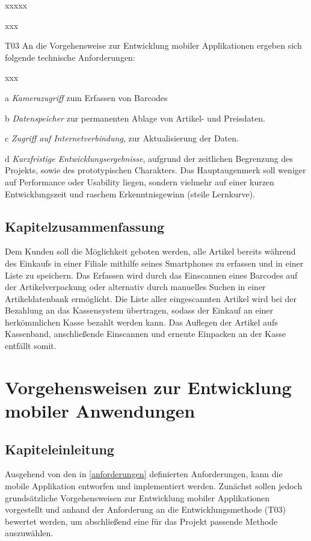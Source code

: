\begin{seToplist}{xxxxx}
\begin{seToplist}{xxx}
	\end{seToplist}
	\item[T03]An die Vorgehensweise zur Entwicklung mobiler Applikationen ergeben sich folgende technische Anforderungen:
	\begin{seToplist}{xxx}
		\item[a]\textit{Kamerazugriff} zum Erfassen von Barcodes
		\item[b]\textit{Datenspeicher} zur permanenten Ablage von Artikel- und Preisdaten.
		\item[c]\textit{Zugriff auf Internetverbindung}, zur Aktualisierung der Daten.
		\item[d]\textit{Kurzfristige Entwicklungsergebnisse}, aufgrund der zeitlichen Begrenzung des Projekts, sowie des prototypischen Charakters. Das Hauptaugenmerk soll weniger auf Performance oder Usability liegen, sondern vielmehr auf einer kurzen Entwicklungszeit und raschem Erkenntnisgewinn (steile Lernkurve).
	\end{seToplist}
\end{seToplist}

\section{Kapitelzusammenfassung}
Dem Kunden soll die Möglichkeit geboten werden, alle Artikel bereits während des Einkaufs in einer Filiale mithilfe seines Smartphones zu erfassen und in einer Liste zu speichern. Das Erfassen wird durch das Einscannen eines Barcodes auf der Artikelverpackung oder alternativ durch manuelles Suchen in einer Artikeldatenbank ermöglicht. Die Liste aller eingescannten Artikel wird bei der Bezahlung an das Kassensystem übertragen, sodass der Einkauf an einer herkömmlichen Kasse bezahlt werden kann. Das Auflegen der Artikel aufs Kassenband, anschließende Einscannen und erneute Einpacken an der Kasse entfällt somit.


\chapter{Vorgehensweisen zur Entwicklung mobiler Anwendungen}

\section{Kapiteleinleitung}
Ausgehend von den in \ref{anforderungen} definierten Anforderungen, kann die mobile Applikation entworfen und implementiert werden. Zunächst sollen jedoch grundsätzliche Vorgehensweisen zur Entwicklung mobiler Applikationen vorgestellt und anhand der Anforderung an die Entwicklungsmethode (T03) bewertet werden, um abschließend eine für das Projekt passende Methode auszuwählen.

